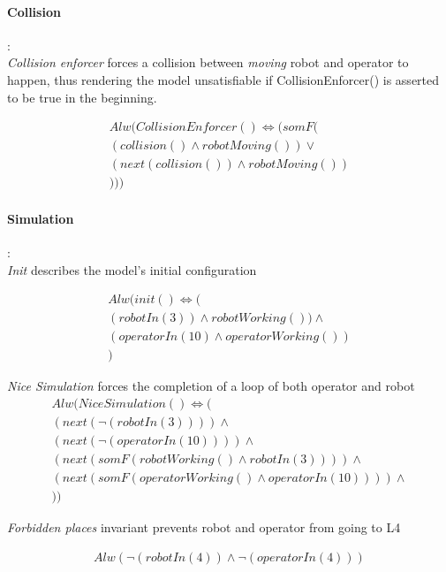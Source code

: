 \paragraph{Collision}:\\

\textit{Collision enforcer} forces a collision between \textit{moving} robot and operator to happen, thus rendering the model unsatisfiable if CollisionEnforcer() is asserted to be true in the beginning.

\begin{align*}
	Alw(CollisionEnforcer()\iff (somF(\\
	(collision() \land robotMoving())\lor\\
	(next(collision()) \land robotMoving())\\
	)))
\end{align*}


\paragraph{Simulation}:\\

\textit{Init} describes the model's initial configuration

\begin{align*}
	Alw(init()\iff (\\
	(robotIn(3))\land robotWorking())\land \\
	(operatorIn(10)\land operatorWorking()) \\
	)
\end{align*}


\textit{Nice Simulation} forces the completion of a loop of both operator and robot
\begin{align*}
	Alw(NiceSimulation()\iff (\\
	(next(\neg(robotIn(3)))) \land \\
	(next(\neg(operatorIn(10)))) \land \\
	(next(somF(robotWorking()\land robotIn(3)))) \land \\
	(next(somF(operatorWorking()\land operatorIn(10)))) \land \\
	))
\end{align*}

\textit{Forbidden places} invariant prevents robot and operator from going to L4

\begin{align*}
	Alw(\neg(robotIn(4)) \land \neg(operatorIn(4)))
\end{align*}

